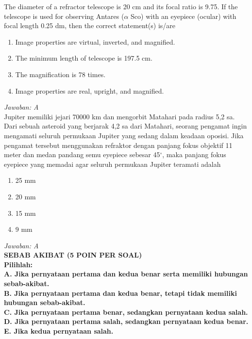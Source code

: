 \documentclass[11pt,fleqn]{exam}
\begin{document}
\begin{questions}
\question The diameter of a refractor telescope is 20 cm and its focal ratio is 9.75. If the telescope is used for observing Antares ($\alpha$ Sco) with an eyepiece (ocular) with focal length 0.25 dm, then the correct statement(s) is/are
\begin{enumerate}
\item Image properties are virtual, inverted, and magnified.
\item The minimum length of telescope is 197.5 cm.
\item The magnification is 78 times.
\item Image properties are real, upright, and magnified.
\end{enumerate}

\textit{Jawaban: A}\\



\question Jupiter memiliki jejari 70000 km dan mengorbit Matahari pada radius 5,2 sa. Dari sebuah asteroid yang berjarak 4,2 sa dari Matahari, seorang pengamat ingin mengamati seluruh permukaan Jupiter yang sedang dalam keadaan oposisi. Jika pengamat tersebut menggunakan refraktor dengan panjang fokus objektif 11 meter dan medan pandang semu eyepiece sebesar 45$^{\circ}$, maka panjang fokus eyepiece yang memadai agar seluruh permukaan Jupiter teramati adalah
\begin{enumerate}
\item 25 mm
\item 20 mm
\item 15 mm
\item 9 mm
\end{enumerate}

\textit{Jawaban: A}\\



\vspace{0.5cm}
\textbf{SEBAB AKIBAT (5 POIN PER SOAL)\\
Pilihlah:\\
A. Jika pernyataan pertama dan kedua benar serta memiliki hubungan sebab-akibat.\\
B. Jika pernyataan pertama dan kedua benar, tetapi tidak memiliki hubungan sebab-akibat.\\
C. Jika pernyataan pertama benar, sedangkan pernyataan kedua salah.\\
D. Jika pernyataan pertama salah, sedangkan pernyataan kedua benar.\\
E. Jika kedua pernyataan salah.\\
}


\end{questions}
\end{document}
